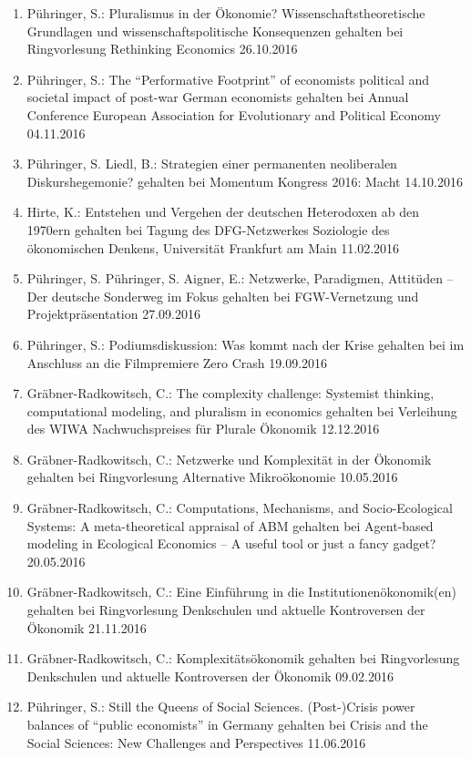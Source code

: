 \begin{enumerate}
	\item Pühringer, S.: Pluralismus in der Ökonomie? Wissenschaftstheoretische Grundlagen und wissenschaftspolitische Konsequenzen gehalten bei Ringvorlesung \glqq Rethinking Economics\grqq{} 26.10.2016
	\item Pühringer, S.: The “Performative Footprint” of economists political and societal impact of post-war German economists gehalten bei Annual Conference \glqq European Association for Evolutionary and Political Economy\grqq{} 04.11.2016
	\item Pühringer, S. Liedl, B.: Strategien einer permanenten neoliberalen Diskurshegemonie? gehalten bei Momentum Kongress 2016: Macht 14.10.2016
	\item Hirte, K.: Entstehen und Vergehen der deutschen Heterodoxen ab den 1970ern gehalten bei Tagung des DFG-Netzwerkes \glqq Soziologie des ökonomischen Denkens\grqq{}, Universität Frankfurt am Main 11.02.2016
	\item Pühringer, S. Pühringer, S. Aigner, E.: Netzwerke, Paradigmen, Attitüden -- Der deutsche Sonderweg im Fokus gehalten bei FGW-Vernetzung und Projektpräsentation 27.09.2016
	\item Pühringer, S.: Podiumsdiskussion: Was kommt nach der Krise gehalten bei im Anschluss an die Filmpremiere \glqq Zero Crash\grqq{} 19.09.2016
	\item Gräbner-Radkowitsch, C.: The complexity challenge: Systemist thinking, computational modeling, and pluralism in economics gehalten bei Verleihung des WIWA Nachwuchspreises für Plurale Ökonomik 12.12.2016
	\item Gräbner-Radkowitsch, C.: Netzwerke und Komplexität in der Ökonomik gehalten bei Ringvorlesung \glqq Alternative Mikroökonomie\grqq{} 10.05.2016
	\item Gräbner-Radkowitsch, C.: Computations, Mechanisms, and Socio-Ecological Systems: A meta-theoretical appraisal of ABM gehalten bei Agent-based modeling in Ecological Economics -- A useful tool or just a fancy gadget? 20.05.2016
	\item Gräbner-Radkowitsch, C.: Eine Einführung in die Institutionenökonomik(en) gehalten bei Ringvorlesung \glqq Denkschulen und aktuelle Kontroversen der Ökonomik\grqq{} 21.11.2016
	\item Gräbner-Radkowitsch, C.: Komplexitätsökonomik gehalten bei Ringvorlesung \glqq Denkschulen und aktuelle Kontroversen der Ökonomik\grqq{} 09.02.2016
	\item Pühringer, S.: Still the Queens of Social Sciences. (Post-)Crisis power balances of “public economists” in Germany gehalten bei Crisis and the Social Sciences: New Challenges and Perspectives 11.06.2016

\end{enumerate}
